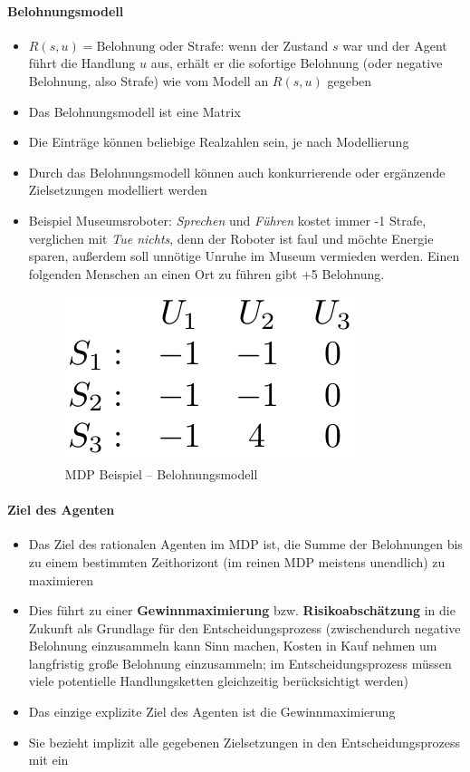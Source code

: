 \paragraph{Belohnungsmodell}
\begin{itemize}
	\item $R(s,u) = \text{Belohnung oder Strafe}$: wenn der Zustand $s$ war und der Agent f\"uhrt die Handlung $u$ aus, erh\"alt er die sofortige Belohnung (oder negative Belohnung, also Strafe) wie vom Modell an $R(s,u)$ gegeben
	\item Das Belohnungsmodell ist eine Matrix
	\item Die Eintr\"age k\"onnen beliebige Realzahlen sein, je nach Modellierung
	\item Durch das Belohnungsmodell k\"onnen auch konkurrierende oder erg\"anzende Zielsetzungen modelliert werden
	\item Beispiel Museumsroboter: \textit{Sprechen} und \textit{Führen} kostet immer -1 Strafe, verglichen mit \textit{Tue nichts}, denn der Roboter ist faul und möchte Energie sparen, außerdem soll unnötige Unruhe im Museum vermieden werden. Einen folgenden Menschen an einen Ort zu führen gibt +5 Belohnung.
	\begin{figure}[!h]
		\centering
  		\includegraphics[width=0.2\linewidth]{figures/ch07_belmodel-bsp.png}
		\caption{MDP Beispiel -- Belohnungsmodell}
		\label{fig:ch07:belmodel-bsp}
	\end{figure}
\end{itemize}

\paragraph{Ziel des Agenten}
\begin{itemize}
	\item Das Ziel des rationalen Agenten im MDP ist, die Summe der Belohnungen bis zu einem bestimmten Zeithorizont (im reinen MDP meistens unendlich) zu maximieren
	\item Dies f\"uhrt zu einer \textbf{Gewinnmaximierung} bzw. \textbf{Risikoabsch\"atzung} in die Zukunft als Grundlage f\"ur den Entscheidungsprozess (zwischendurch negative Belohnung einzusammeln kann Sinn machen, Kosten in Kauf nehmen um langfristig große Belohnung einzusammeln; im Entscheidungsprozess müssen viele potentielle Handlungsketten gleichzeitig berücksichtigt werden)
	\item Das einzige explizite Ziel des Agenten ist die Gewinnmaximierung
	\item Sie bezieht implizit alle gegebenen Zielsetzungen in den Entscheidungsprozess mit ein
\end{itemize}


